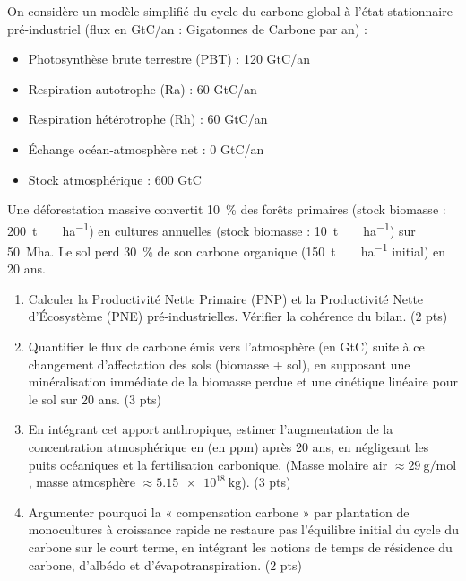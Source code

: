 \documentclass[11pt]{article}
\begin{document}
\begin{exercice}
On considère un modèle simplifié du cycle du carbone global à l'état stationnaire pré-industriel (flux en GtC/an : Gigatonnes de Carbone par an) :
\begin{itemize}
    \item Photosynthèse brute terrestre (PBT) : 120 GtC/an
    \item Respiration autotrophe (Ra) : 60 GtC/an
    \item Respiration hétérotrophe (Rh) : 60 GtC/an
    \item Échange océan-atmosphère net : 0 GtC/an
    \item Stock atmosphérique : 600 GtC
\end{itemize}
Une déforestation massive convertit \qty{10}{\percent} des forêts primaires (stock biomasse : \qty{200}{\tonne\ \per\hectare}) en cultures annuelles (stock biomasse : \qty{10}{\tonne\ \per\hectare}) sur \qty{50}{\mega\hectare}. Le sol perd \qty{30}{\percent} de son carbone organique (\qty{150}{\tonne\ \per\hectare} initial) en 20 ans.

\begin{enumerate}
    \item Calculer la Productivité Nette Primaire (PNP) et la Productivité Nette d'Écosystème (PNE) pré-industrielles. Vérifier la cohérence du bilan. (2 pts)
    \item Quantifier le flux de carbone émis vers l'atmosphère (en GtC) suite à ce changement d'affectation des sols (biomasse + sol), en supposant une minéralisation immédiate de la biomasse perdue et une cinétique linéaire pour le sol sur 20 ans. (3 pts)
    \item En intégrant cet apport anthropique, estimer l'augmentation de la concentration atmosphérique en  (en ppm) après 20 ans, en négligeant les puits océaniques et la fertilisation carbonique. (Masse molaire air $\approx \qty{29}{\gram\per\mol}$, masse atmosphère $\approx \qty{5,15e18}{\kilogram}$). (3 pts)
    \item Argumenter pourquoi la « compensation carbone » par plantation de monocultures à croissance rapide ne restaure pas l'équilibre initial du cycle du carbone sur le court terme, en intégrant les notions de temps de résidence du carbone, d'albédo et d'évapotranspiration. (2 pts)
\end{enumerate}
\end{exercice}
\end{document}
